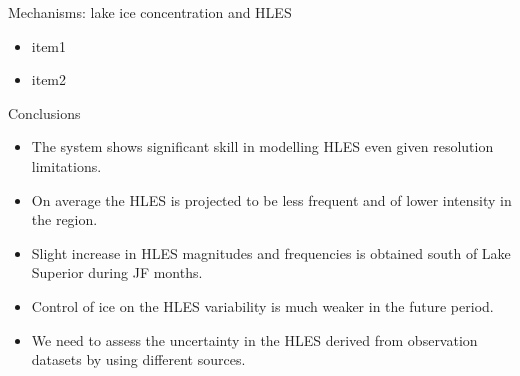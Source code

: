 \documentclass{beamer}
\begin{document}
  \begin{frame}{Mechanisms: lake ice concentration and HLES}

    \begin{itemize}
      \item item1
      \item item2
    \end{itemize}

  \end{frame}



  \begin{frame}{Conclusions}
    \begin{itemize}
      \item The system shows significant skill in modelling HLES even given resolution limitations.
      \item On average the HLES is projected to be less frequent and of lower intensity in the region.
      \item Slight increase in HLES magnitudes and frequencies is obtained south of Lake Superior during JF months.
      \item Control of ice on the HLES variability is much weaker in the future period.
      \item We need to assess the uncertainty in the HLES derived from observation datasets by using different sources.
    \end{itemize}
  \end{frame}
\end{document}
